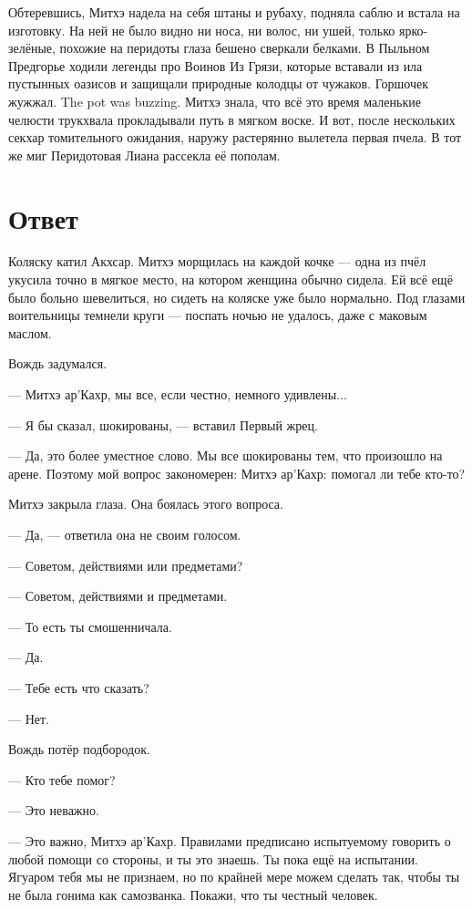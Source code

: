 Обтеревшись, Митхэ надела на себя штаны и рубаху, подняла саблю и встала на изготовку.
На ней не было видно ни носа, ни волос, ни ушей, только ярко-зелёные, похожие на перидоты глаза бешено сверкали белками.
В Пыльном Предгорье ходили легенды про Воинов Из Грязи, которые вставали из ила пустынных оазисов и защищали природные колодцы от чужаков. %
{Горшочек жужжал.}
{The pot was buzzing.}
Митхэ знала, что всё это время маленькие челюсти трукхвала прокладывали путь в мягком воске.
И вот, после нескольких секхар томительного ожидания, наружу растерянно вылетела первая пчела.
В тот же миг Перидотовая Лиана рассекла её пополам.

\section{Ответ}

Коляску катил Акхсар.
Митхэ морщилась на каждой кочке --- одна из пчёл укусила точно в мягкое место, на котором женщина обычно сидела.
Ей всё ещё было больно шевелиться, но сидеть на коляске уже было нормально.
Под глазами воительницы темнели круги --- поспать ночью не удалось, даже с маковым маслом.

\textspace

Вождь задумался.

--- Митхэ ар'Кахр, мы все, если честно, немного удивлены...

--- Я бы сказал, шокированы, --- вставил Первый жрец.

--- Да, это более уместное слово.
Мы все шокированы тем, что произошло на арене.
Поэтому мой вопрос закономерен: Митхэ ар'Кахр: помогал ли тебе кто-то?

Митхэ закрыла глаза.
Она боялась этого вопроса.

--- Да, --- ответила она не своим голосом.

--- Советом, действиями или предметами?

--- Советом, действиями и предметами.

--- То есть ты смошенничала.

--- Да.

--- Тебе есть что сказать?

--- Нет.

Вождь потёр подбородок.

--- Кто тебе помог?

--- Это неважно.

--- Это важно, Митхэ ар'Кахр.
Правилами предписано испытуемому говорить о любой помощи со стороны, и ты это знаешь.
Ты пока ещё на испытании.
Ягуаром тебя мы не признаем, но по крайней мере можем сделать так, чтобы ты не была гонима как самозванка.
Покажи, что ты честный человек.

